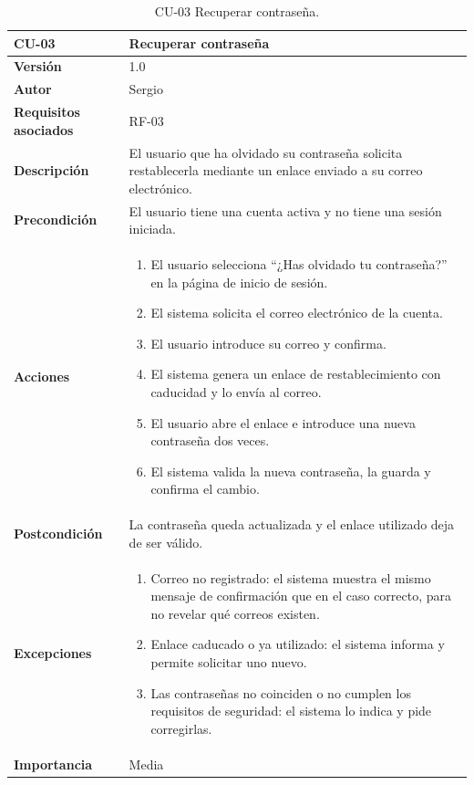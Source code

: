 \begin{table}[p]
	\centering
	\begin{tabularx}{\linewidth}{ p{} p{} }
		\toprule
		\textbf{CU-03}    & \textbf{Recuperar contraseña}\\
		\toprule
		\textbf{Versión}              & 1.0    \\
		\textbf{Autor}                & Sergio \\
		\textbf{Requisitos asociados} & RF-03 \\
		\textbf{Descripción}          & El usuario que ha olvidado su contraseña solicita restablecerla mediante un enlace enviado a su correo electrónico. \\
		\textbf{Precondición}         & El usuario tiene una cuenta activa y no tiene una sesión iniciada. \\
		\textbf{Acciones}             &
		\begin{enumerate}
			\def\labelenumi{\arabic{enumi}.}
			\tightlist
			\item El usuario selecciona ``¿Has olvidado tu contraseña?'' en la página de inicio de sesión.
			\item El sistema solicita el correo electrónico de la cuenta.
			\item El usuario introduce su correo y confirma.
			\item El sistema genera un enlace de restablecimiento con caducidad y lo envía al correo.
			\item El usuario abre el enlace e introduce una nueva contraseña dos veces.
			\item El sistema valida la nueva contraseña, la guarda y confirma el cambio.
		\end{enumerate}\\
		\textbf{Postcondición}        & La contraseña queda actualizada y el enlace utilizado deja de ser válido. \\
		\textbf{Excepciones}          &
		\begin{enumerate}
			\def\labelenumi{\arabic{enumi}.}
			\tightlist
			\item Correo no registrado: el sistema muestra el mismo mensaje de confirmación que en el caso correcto, para no revelar qué correos existen.
			\item Enlace caducado o ya utilizado: el sistema informa y permite solicitar uno nuevo.
			\item Las contraseñas no coinciden o no cumplen los requisitos de seguridad: el sistema lo indica y pide corregirlas.
		\end{enumerate}\\
		\textbf{Importancia}          & Media \\
		\bottomrule
	\end{tabularx}
	\caption{CU-03 Recuperar contraseña.}
\end{table}

